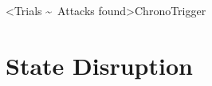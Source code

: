 \interlude[2]<Trials \textasciitilde\ Attacks found>{ChronoTrigger}
\section{State Disruption}









